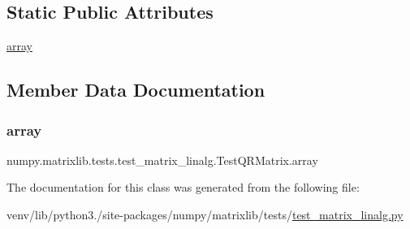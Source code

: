 \subsection*{Static Public Attributes}
\begin{DoxyCompactItemize}
\item 
\hyperlink{classnumpy_1_1matrixlib_1_1tests_1_1test__matrix__linalg_1_1TestQRMatrix_afb4e56bdf07dd0587c00551746bd88de}{array}
\end{DoxyCompactItemize}


\subsection{Member Data Documentation}
\mbox{\label{classnumpy_1_1matrixlib_1_1tests_1_1test__matrix__linalg_1_1TestQRMatrix_afb4e56bdf07dd0587c00551746bd88de}} 
\subsubsection{\texorpdfstring{array}{array}}
{\footnotesize\ttfamily numpy.\+matrixlib.\+tests.\+test\+\_\+matrix\+\_\+linalg.\+Test\+Q\+R\+Matrix.\+array\hspace{0.3cm}{\ttfamily [static]}}



The documentation for this class was generated from the following file\+:\begin{DoxyCompactItemize}
\item 
venv/lib/python3./site-\/packages/numpy/matrixlib/tests/\hyperlink{test__matrix__linalg_8py}{test\+\_\+matrix\+\_\+linalg.\+py}\end{DoxyCompactItemize}
